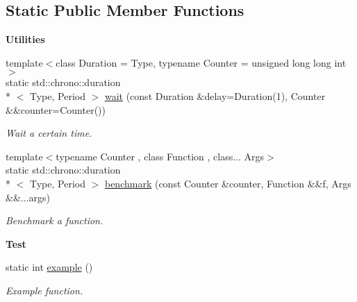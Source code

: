 \subsection*{Static Public Member Functions}
\begin{Indent}{\bf Utilities}\par
\begin{DoxyCompactItemize}
\item 
{\footnotesize template$<$class Duration  = Type, typename Counter  = unsigned long long int$>$ }\\static std\-::chrono\-::duration\\*
$<$ Type, Period $>$ \hyperlink{exceptionmagrathea_1_1Timer_a5636affbf45384af93ab036eb15ab274}{wait} (const Duration \&delay=Duration(1), Counter \&\&counter=Counter())
\begin{DoxyCompactList}\small\item\em Wait a certain time. \end{DoxyCompactList}\item 
{\footnotesize template$<$typename Counter , class Function , class... Args$>$ }\\static std\-::chrono\-::duration\\*
$<$ Type, Period $>$ \hyperlink{exceptionmagrathea_1_1Timer_a5ede3d60334682c611c64dadd218b225}{benchmark} (const Counter \&counter, Function \&\&f, Args \&\&...args)
\begin{DoxyCompactList}\small\item\em Benchmark a function. \end{DoxyCompactList}\end{DoxyCompactItemize}
\end{Indent}
\begin{Indent}{\bf Test}\par
\begin{DoxyCompactItemize}
\item 
static int \hyperlink{exceptionmagrathea_1_1Timer_a3dcb379540e25030a60b48319d1448d7}{example} ()
\begin{DoxyCompactList}\small\item\em Example function. \end{DoxyCompactList}\end{DoxyCompactItemize}
\end{Indent}
